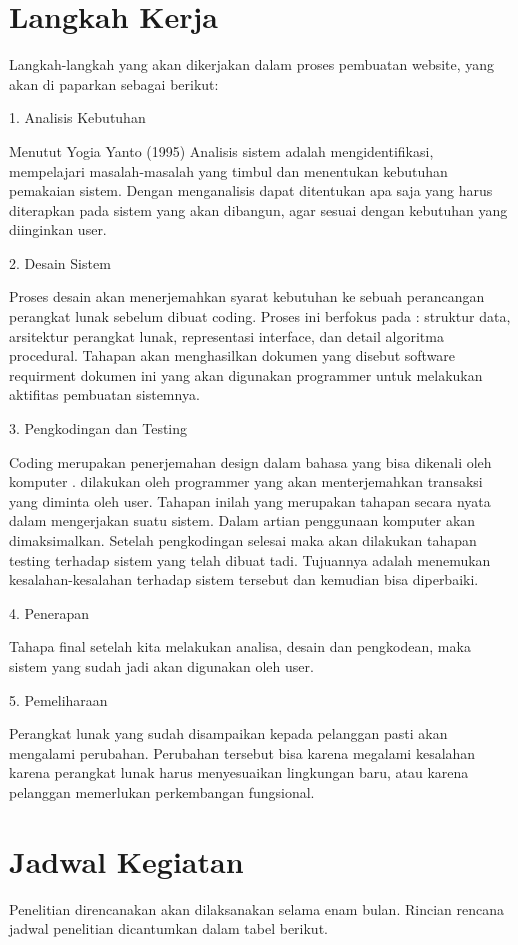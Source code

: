 \documentclass{jtetiproposalskripsi}
\begin{document}
\section{Langkah Kerja}
Langkah-langkah yang akan dikerjakan dalam proses pembuatan website, yang akan di paparkan sebagai berikut:

1.	Analisis Kebutuhan 

Menutut Yogia Yanto (1995) Analisis sistem adalah mengidentifikasi, mempelajari masalah-masalah yang timbul dan menentukan kebutuhan pemakaian sistem. Dengan menganalisis dapat ditentukan apa saja yang harus diterapkan pada sistem yang akan dibangun, agar sesuai dengan kebutuhan yang diinginkan user.

2.	Desain Sistem

Proses desain akan menerjemahkan syarat kebutuhan ke sebuah perancangan perangkat lunak sebelum dibuat coding. Proses ini  berfokus pada : struktur data, arsitektur perangkat lunak, representasi interface, dan detail algoritma procedural. Tahapan akan menghasilkan dokumen yang disebut software requirment dokumen ini yang akan digunakan programmer untuk melakukan aktifitas pembuatan sistemnya.

3.	Pengkodingan dan Testing

Coding merupakan penerjemahan design dalam bahasa yang bisa dikenali oleh komputer . dilakukan oleh programmer yang akan menterjemahkan transaksi yang diminta oleh user. Tahapan inilah yang merupakan tahapan secara nyata dalam mengerjakan suatu sistem. Dalam artian penggunaan komputer akan dimaksimalkan. Setelah pengkodingan selesai maka akan dilakukan tahapan testing terhadap sistem yang telah dibuat tadi. Tujuannya adalah menemukan kesalahan-kesalahan terhadap sistem tersebut dan kemudian bisa diperbaiki.

4.	Penerapan

Tahapa final setelah kita melakukan analisa, desain dan pengkodean, maka sistem yang sudah jadi akan digunakan oleh user.

5.	Pemeliharaan

Perangkat lunak yang sudah disampaikan kepada pelanggan pasti  akan mengalami perubahan. Perubahan tersebut bisa karena megalami kesalahan karena perangkat lunak harus menyesuaikan lingkungan baru, atau karena pelanggan memerlukan perkembangan fungsional.



\section{Jadwal Kegiatan}
Penelitian direncanakan akan dilaksanakan selama enam bulan. Rincian rencana jadwal penelitian dicantumkan dalam tabel berikut.
\end{document}
